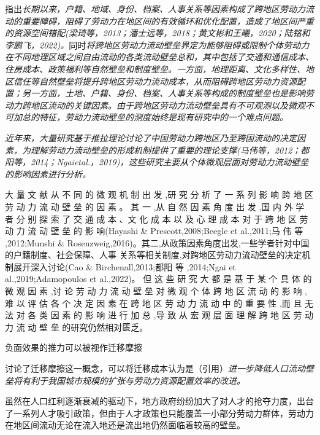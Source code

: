 \documentclass[a4paper,12pt]{article}
\begin{document}
\cite{JiangWeiZhongGuoKuaDiQuLaoDongLiLiuDongBiLeiCeDuFangFaYanJinQuShiYuJueDingYinSu2024}指出\textit{长期以来，户籍、地域、身份、档案、人事关系等因素构成了跨地区劳动力流动的重要障碍，阻碍了劳动力在地区间的有效循环和优化配置，造成了地区间严重的资源空间错配(梁琦等，2013；潘士远等，2018；黄文彬和王曦，2020；陆铭和李鹏飞，2022)。}同时\textit{将跨地区劳动力流动壁垒界定为能够阻碍或限制个体劳动力在不同地理区域之间自由流动的各类流动壁垒总和，其中包括了交通和通信成本、住房成本、政策福利等自然壁垒和制度壁垒。一方面，地理距离、文化多样性、地区信任等自然壁垒将提升跨地区劳动力流动成本，从而阻碍跨地区劳动力资源配置；另一方面，土地、户籍、身份、档案、人事关系等构成的制度壁垒也是影响劳动力跨地区流动的关键因素。由于跨地区劳动力流动壁垒具有不可观测以及微观不可加总的特征，劳动力流动壁垒的测度始终是现有研究中的一个难点问题。}

\textit{近年来，大量研究基于推拉理论讨论了中国劳动力跨地区乃至跨国流动的决定因素，为理解劳动力流动壁垒的形成机制提供了重要的理论支撑(马伟等，2012；都阳等，2014；Ngaietal.，2019)，这些研究主要从个体微观层面对劳动力流动壁垒的影响因素进行分析。}

大 量 文 献 从 不 同 的 微 观 机 制 出 发 ,研 究 分 析 了 一 系 列 影 响 跨 地 区 劳 动 力 流 动 壁 垒 的 因 素 。 其 一 ,从 自 然 因 素 角 度 出 发 ,国 内 外 学 者 分 别 探 索 了 交 通 成 本 、文 化 成 本 以 及 心 理 成 本 对 于  跨 地 区 劳 动 力 流 动 壁 垒 的 影 响(Hayashi \& Prescott,2008;Beegle et al.,2011;马 伟 等 ,2012;Munshi \& Rosenzweig,2016)。其二,从政策因素角度出发,一些学者针对中国的户籍制度、社会保障、人事 关系等相关制度,对跨地区劳动力流动壁垒的决定机制展开深入讨论(Cao \& Birchenall,2013;都阳  等 ,2014;Ngai et al.,2019;Adamopoulos et al.,2022)。 但 这 些 研 究 大 都 是 基 于 某 个 具 体 的 微 观 因 素 ,讨 论 劳 动 力 流 动 壁 垒 对 微 观 个 体 跨 地 区 流 动 的 影 响 ,难 以 评 估 各 个 决 定 因 素 在 跨 地 区 劳 动 力 流 动 中 的 重 要 性 ,而 且 无 法 对 各 类 因 素 的 影 响 进 行 加 总 ,导 致 从 宏 观 层 面 理 解 跨 地 区 劳 动 力 流 动 壁 垒 的研究仍然相对匮乏。

负面效果的推力可以被视作迁移摩擦

\cite{WangLiLiWoGuoRenKouQianYiChengBenChengShiGuiMoYuShengChanLu2020}讨论了迁移摩擦这一概念，可以将迁移成本认为是（引用）\textit{进一步降低人口流动壁垒将有利于我国城市规模的扩张与劳动力资源配置效率的改进。}

虽然在人口红利逐渐衰减的驱动下，地方政府纷纷加大了对人才的抢夺力度，出台了一系列人才吸引政策，但由于人才政策也只能覆盖一小部分劳动力群体，劳动力在地区间流动无论在流入地还是流出地仍然面临着较高的壁垒。
\end{document}
